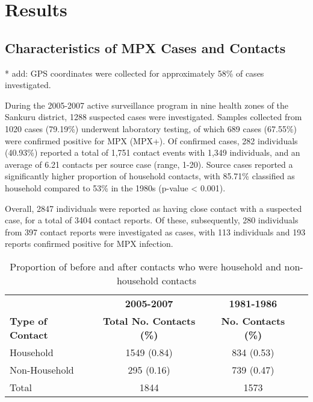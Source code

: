 \section{Results}

\subsection{Characteristics of MPX Cases and Contacts}

* add: GPS coordinates were collected for approximately 58\% of cases investigated. 

During the 2005-2007 active surveillance program in nine health zones of the Sankuru district, 1288 suspected cases were investigated. Samples collected from 1020 cases (79.19\%) underwent laboratory testing, of which 689 cases (67.55\%) were confirmed positive for MPX (MPX+). Of confirmed cases, 282 individuals (40.93\%) reported a total of 1,751 contact events with 1,349 individuals, and an average of 6.21 contacts per source case (range, 1-20). Source cases reported a significantly higher proportion of household contacts, with 85.71\% classified as household compared to 53\% in the 1980s (p-value < 0.001).



Overall, 2847 individuals were reported as having close contact with a suspected case, for a total of 3404 contact reports. Of these, 
subsequently, 280 individuals from 397 contact reports were investigated as cases, with 113 individuals and 193 reports confirmed positive for MPX infection. 

\begin{table}
\centering
\begin{tabular}{lccc} 
\tabletypesize{\footnotesize}
\toprule
& \textbf{2005-2007} & \textbf{1981-1986} \\
\cmidrule(l){2-3}
\textbf{Type of Contact}  &	\textbf{Total No. Contacts (\%)} &	\textbf{ No. Contacts (\%)} \\
\midrule
Household  & 1549 (0.84) & 834 (0.53) \\
Non-Household  &	295	(0.16) & 739 (0.47) \\
\midrule
Total &	1844 & 1573  \\
\bottomrule
\end{tabular}
\caption{Proportion of before and after contacts who were household and non-household contacts}
\label{tab:table1}
\end{table}



